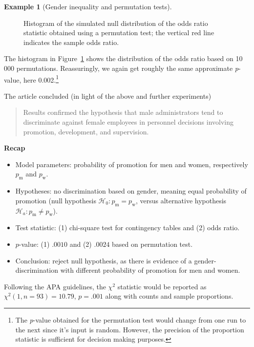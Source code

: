 \documentclass[
  11pt,
  letterpaper,
]{scrbook}
\providecommand{\tightlist}{%
  \setlength{\itemsep}{0pt}\setlength{\parskip}{0pt}}\usepackage{longtable,booktabs,array}
\theoremstyle{definition}
\newtheorem{example}{Example}[chapter]
\theoremstyle{definition}
\theoremstyle{remark}
\begin{document}
\begin{example}[Gender inequality and permutation
tests]
\begin{figure}[ht!]
{}

\caption{\label{fig-infer-odds-ratio-permutation}Histogram of the
simulated null distribution of the odds ratio statistic obtained using a
permutation test; the vertical red line indicates the sample odds
ratio.}

\end{figure}%

The histogram in Figure~\ref{fig-infer-odds-ratio-permutation} shows the
distribution of the odds ratio based on 10 000 permutations.
Reassuringly, we again get roughly the same approximate \emph{p}-value,
here 0.002.\footnote{The \emph{p}-value obtained for the permutation
  test would change from one run to the next since it's input is random.
  However, the precision of the proportion statistic is sufficient for
  decision making purposes.}

The article concluded (in light of the above and further experiments)

\begin{quote}
Results confirmed the hypothesis that male administrators tend to
discriminate against female employees in personnel decisions involving
promotion, development, and supervision.
\end{quote}

\textbf{Recap}

\begin{itemize}
\tightlist
\item
  Model parameters: probability of promotion for men and women,
  respectively \(p_{\text{m}}\) and \(p_{\text{w}}\).
\item
  Hypotheses: no discrimination based on gender, meaning equal
  probability of promotion (null hypothesis
  \(\mathscr{H}_0: p_{\text{m}}=p_{\text{w}}\), versus alternative
  hypothesis \(\mathscr{H}_a: p_{\text{m}}\neq p_{\text{w}}\)).
\item
  Test statistic: (1) chi-square test for contingency tables and (2)
  odds ratio.
\item
  \(p\)-value: (1) \(.0010\) and (2) \(.0024\) based on permutation
  test.
\item
  Conclusion: reject null hypothesis, as there is evidence of a
  gender-discrimination with different probability of promotion for men
  and women.
\end{itemize}

Following the APA guidelines, the \(\chi^2\) statistic would be reported
as \(\chi^2(1, n = 93) = 10.79\), \(p = .001\) along with counts and
sample proportions.

\end{example}
\end{document}
